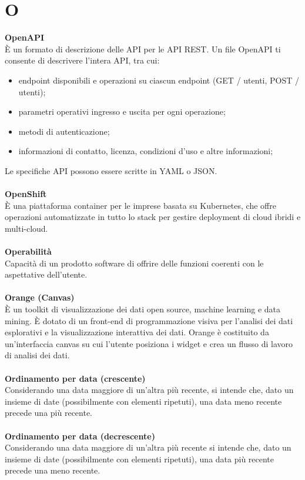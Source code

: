 \section{O}

\textbf{OpenAPI}\\
È un formato di descrizione delle API per le API REST. Un file OpenAPI ti consente di descrivere l'intera API, tra cui:
\begin{itemize}
    \item endpoint disponibili e operazioni su ciascun endpoint (GET / utenti, POST / utenti);
    \item parametri operativi ingresso e uscita per ogni operazione;
    \item metodi di autenticazione;
    \item informazioni di contatto, licenza, condizioni d'uso e altre informazioni;
\end{itemize}
Le specifiche API possono essere scritte in YAML o JSON.
\\ \\
\textbf{OpenShift}\\
È una piattaforma container per le imprese basata su Kubernetes, che offre operazioni automatizzate in tutto lo stack per gestire deployment di cloud ibridi e multi-cloud. \\ \\
\textbf{Operabilità}\\
Capacità di un prodotto software di offrire delle funzioni coerenti con le aspettative dell’utente. \\ \\
\textbf{Orange (Canvas)}\\
È un toolkit di visualizzazione dei dati open source, machine learning e data mining. È dotato di un front-end di programmazione visiva per l'analisi dei dati esplorativi e la visualizzazione interattiva dei dati. Orange è costituito da un'interfaccia canvas su cui l'utente posiziona i widget e crea un flusso di lavoro di analisi dei dati. \\ \\
\textbf{Ordinamento per data (crescente)}\\
Considerando una data maggiore di un'altra più recente, si intende che, dato un insieme di date (possibilmente con elementi ripetuti), una data meno recente precede una più recente. \\ \\
\textbf{Ordinamento per data (decrescente)}\\
Considerando una data maggiore di un'altra più recente si intende che, dato un insieme di date (possibilmente con elementi ripetuti), una data più recente precede una meno recente. \\ \\
